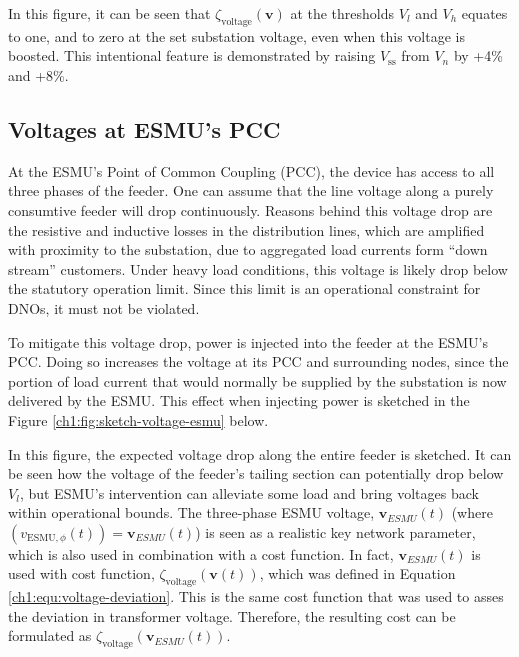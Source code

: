 

In this figure, it can be seen that $\zeta_\text{voltage}(\textbf{v})$ at the thresholds $V_l$ and $V_h$ equates to one, and to zero at the set substation voltage, even when this voltage is boosted.
This intentional feature is demonstrated by raising $V_\text{ss}$ from $V_n$ by +4\% and +8\%.

\subsection{Voltages at ESMU's PCC}
\label{ch1:subsec:voltages-at-esmu}

At the ESMU's Point of Common Coupling (PCC), the device has access to all three phases of the feeder.
One can assume that the line voltage along a purely consumtive feeder will drop continuously.
Reasons behind this voltage drop are the resistive and inductive losses in the distribution lines, which are amplified with proximity to the substation, due to aggregated load currents form ``down stream'' customers.
Under heavy load conditions, this voltage is likely drop below the statutory operation limit.
Since this limit is an operational constraint for DNOs, it must not be violated.

To mitigate this voltage drop, power is injected into the feeder at the ESMU's PCC.
Doing so increases the voltage at its PCC and surrounding nodes, since the portion of load current that would normally be supplied by the substation is now delivered by the ESMU.
This effect when injecting power is sketched in the Figure \ref{ch1:fig:sketch-voltage-esmu} below.




In this figure, the expected voltage drop along the entire feeder is sketched. 
It can be seen how the voltage of the feeder's tailing section can potentially drop below $V_l$, but ESMU's intervention can alleviate some load and bring voltages back within operational bounds.
The three-phase ESMU voltage, $\textbf{v}_{ESMU}(t)$ (where $(v_{\text{ESMU},\phi}(t)) = \textbf{v}_{ESMU}(t)$) is seen as a realistic key network parameter, which is also used in combination with a cost function.
In fact, $\textbf{v}_{ESMU}(t)$ is used with cost function, $\zeta_\text{voltage}(\textbf{v}(t))$, which was defined in Equation \ref{ch1:equ:voltage-deviation}.
This is the same cost function that was used to asses the deviation in transformer voltage.
Therefore, the resulting cost can be formulated as $\zeta_\text{voltage}(\textbf{v}_{ESMU}(t))$.

